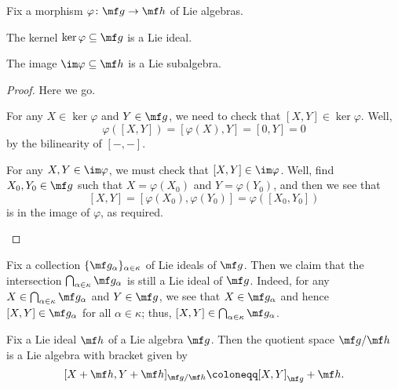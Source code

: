 \documentclass[../notes.tex]{subfiles}
\begin{document}
\begin{lemma} \label{lem:subalgebra-checks}
	Fix a morphism $\varphi\colon\mf g\to\mf h$ of Lie algebras.
	\begin{listalph}
		\item The kernel $\ker\varphi\subseteq\mf g$ is a Lie ideal.
		\item The image $\im\varphi\subseteq\mf h$ is a Lie subalgebra.
	\end{listalph}
\end{lemma}
\begin{proof}
	Here we go.
	\begin{listalph}
		\item For any $X\in\ker\varphi$ and $Y\in\mf g$, we need to check that $[X,Y]\in\ker\varphi$. Well,
		\[\varphi([X,Y])=[\varphi(X),Y]=[0,Y]=0\]
		by the bilinearity of $[-,-]$.
		\item For any $X,Y\in\im\varphi$, we must check that $[X,Y]\in\im\varphi$. Well, find $X_0,Y_0\in\mf g$ such that $X=\varphi(X_0)$ and $Y=\varphi(Y_0)$, and then we see that
		\[[X,Y]=[\varphi(X_0),\varphi(Y_0)]=\varphi([X_0,Y_0])\]
		is in the image of $\varphi$, as required.
		\qedhere
	\end{listalph}
\end{proof}
\begin{remark} \label{rem:intersect-lie-ideals}
	Fix a collection $\{\mf g_\alpha\}_{\alpha\in\kappa}$ of Lie ideals of $\mf g$. Then we claim that the intersection $\bigcap_{\alpha\in\kappa}\mf g_\alpha$ is still a Lie ideal of $\mf g$. Indeed, for any $X\in\bigcap_{\alpha\in\kappa}\mf g_\alpha$ and $Y\in\mf g$, we see that $X\in\mf g_\alpha$ and hence $[X,Y]\in\mf g_\alpha$ for all $\alpha\in\kappa$; thus, $[X,Y]\in\bigcap_{\alpha\in\kappa}\mf g_\alpha$.
\end{remark}
\begin{lemma}
	Fix a Lie ideal $\mf h$ of a Lie algebra $\mf g$. Then the quotient space $\mf g/\mf h$ is a Lie algebra with bracket given by
	\[[X+\mf h,Y+\mf h]_{\mf g/\mf h}\coloneqq[X,Y]_{\mf g}+\mf h.\]
\end{lemma}
\end{document}

